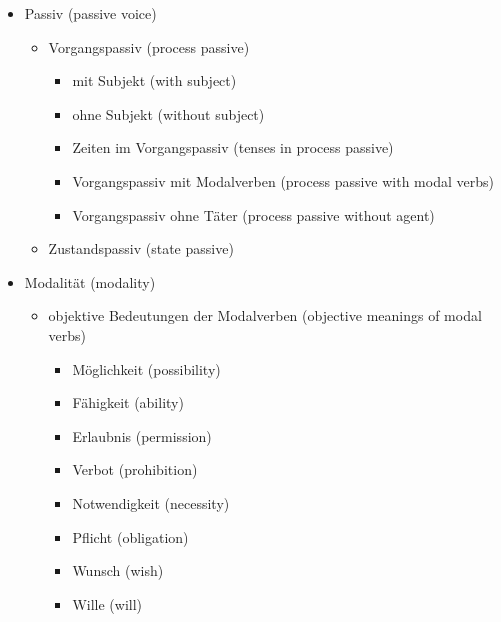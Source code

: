 \documentclass[a4paper]{article}
\begin{document}
\begin{itemize}
\begin{itemize}
                \item Konjunktionen {\small (conjunctions)}
                \begin{itemize}
                    \item nebenordnende Konjunktionen {\small (coordinating conjunctions)}
                    \item unterordnende Konjunktionen {\small (subordinating conjunctions)}
                \end{itemize}
            \end{itemize}
            
            \item Passiv {\small (passive voice)}
            \begin{itemize}
                \item Vorgangspassiv {\small (process passive)}
                \begin{itemize}
                    \item mit Subjekt {\small (with subject)}
                    \item ohne Subjekt {\small (without subject)}
                    \item Zeiten im Vorgangspassiv {\small (tenses in process passive)}
                    \item Vorgangspassiv mit Modalverben {\small (process passive with modal verbs)}
                    \item Vorgangspassiv ohne Täter {\small (process passive without agent)}
                \end{itemize}
                
                \item Zustandspassiv {\small (state passive)}
            \end{itemize}
            
            \item Modalität {\small (modality)}
            \begin{itemize}
                \item objektive Bedeutungen der Modalverben {\small (objective meanings of modal verbs)}
                \begin{itemize}
                    \item Möglichkeit {\small (possibility)}
                    \item Fähigkeit {\small (ability)}
                    \item Erlaubnis {\small (permission)}
                    \item Verbot {\small (prohibition)}
                    \item Notwendigkeit {\small (necessity)}
                    \item Pflicht {\small (obligation)}
                    \item Wunsch {\small (wish)}
                    \item Wille {\small (will)}
                \end{itemize}
                

\end{itemize}
\end{itemize}
\end{document}
